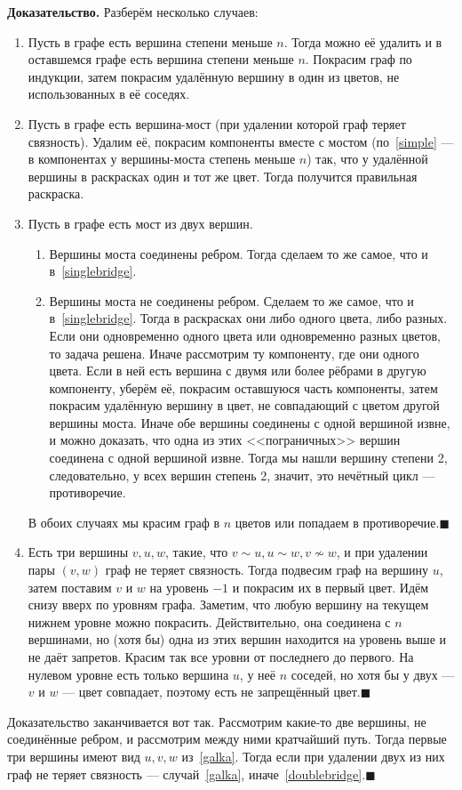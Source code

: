 \documentclass[a4paper,12pt]{article}
\newcommand*{\QEDA}{\hfill\ensuremath{\blacksquare}}
\newcommand{\proof}{{\bf Доказательство. }}
\begin{document}
\proof Разберём несколько случаев:
\begin{enumerate}
	\item Пусть в графе есть вершина степени меньше $n$. Тогда можно её удалить и в оставшемся графе есть вершина степени меньше $n$. Покрасим граф по индукции, затем покрасим удалённую вершину в один из цветов, не использованных в её соседях.\label{simple}
	\item Пусть в графе есть вершина-мост (при удалении которой граф теряет связность). Удалим её, покрасим компоненты вместе с мостом (по~\ref{simple} --- в компонентах у вершины-моста степень меньше $n$) так, что у удалённой вершины в раскрасках один и тот же цвет. Тогда получится правильная раскраска.\label{singlebridge}
	\item Пусть в графе есть мост из двух вершин.\label{doublebridge}
	\begin{enumerate}
		\item Вершины моста соединены ребром. Тогда сделаем то же самое, что и в~\ref{singlebridge}.
		\item Вершины моста не соединены ребром. Сделаем то же самое, что и в~\ref{singlebridge}. Тогда в раскрасках они либо одного цвета, либо разных. Если они одновременно одного цвета или одновременно разных цветов, то задача решена. Иначе рассмотрим ту компоненту, где они одного цвета. Если в ней есть вершина с двумя или более рёбрами в другую компоненту, уберём её, покрасим оставшуюся часть компоненты, затем покрасим удалённую вершину в цвет, не совпадающий с цветом другой вершины моста. Иначе обе вершины соединены с одной вершиной извне, и можно доказать, что одна из этих <<пограничных>> вершин соединена с одной вершиной извне. Тогда мы нашли вершину степени 2, следовательно, у всех вершин степень 2, значит, это нечётный цикл --- противоречие.
	\end{enumerate}
	В обоих случаях мы красим граф в $n$ цветов или попадаем в противоречие.\QEDA
	\item Есть три вершины $v,u,w$, такие, что $v\sim u,u\sim w,v\not\sim w$, и при удалении пары $(v,w)$ граф не теряет связность. Тогда подвесим граф на вершину $u$, затем поставим $v$ и $w$ на уровень $-1$ и покрасим их в первый цвет. Идём снизу вверх по уровням графа. Заметим, что любую вершину на текущем нижнем уровне можно покрасить. Действительно, она соединена с $n$ вершинами, но (хотя бы) одна из этих вершин находится на уровень выше и не даёт запретов. Красим так все уровни от последнего до первого. На нулевом уровне есть только вершина $u$, у неё $n$ соседей, но хотя бы у двух --- $v$ и $w$ --- цвет совпадает, поэтому есть не запрещённый цвет.\label{galka}\QEDA
\end{enumerate}
Доказательство заканчивается вот так. Рассмотрим какие-то две вершины, не соединённые ребром, и рассмотрим между ними кратчайший путь. Тогда первые три вершины имеют вид $u,v,w$ из~\ref{galka}. Тогда если при удалении двух из них граф не теряет связность --- случай~\ref{galka}, иначе~\ref{doublebridge}.\QEDA\\
\end{document}
